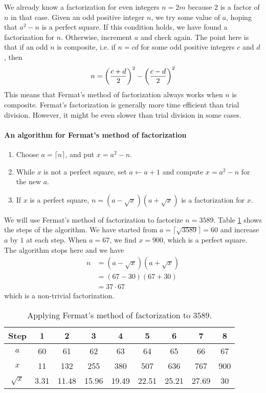 We already know a factorization for even integers $n=2m$ because $2$ is a factor of $n$ in that case. Given an odd positive integer $n$, we try some value of $a$, hoping that $a^2-n$ is a perfect square. If this condition holds, we have found a factorization for $n$. Otherwise, increment $a$ and check again. The point here is that if an odd $n$ is composite, i.e. if $n=cd$ for some odd positive integers $c$ and $d$, then
	\begin{align*}
		n = \left(\frac{c+d}{2}\right)^2 - \left(\frac{c-d}{2}\right)^2
	\end{align*}
This means that Fermat's method of factorization always works when $n$ is composite. Fermat's factorization is generally more time efficient than trial division. However, it might be even slower than trial division in some cases.
\paragraph{An algorithm for Fermat's method of factorization}
	\begin{enumerate}[1.]
		\item Choose $a=\lceil n \rceil$, and put $x=a^2-n$.
		\item While $x$ is not a perfect square, set $a \longleftarrow a+1$ and compute $x=a^2-n$ for the new $a$.
		\item If $x$ is a perfect square, $n=(a-\sqrt x)(a+\sqrt x)$ is a factorization for $x$.
	\end{enumerate}

\begin{example}
	We will use Fermat's method of factorization to factorize $n=3589$. Table \ref{table:fermat} shows the steps of the algorithm. We have started from $a=\lceil\sqrt{3589} \rceil=60$ and increase $a$ by $1$ at each step. When $a=67$, we find $x=900$, which is a perfect square. The algorithm stops here and we have
		\begin{align*}
			n &= (a-\sqrt x)(a+\sqrt x)\\
	  &= (67-30)(67+30)\\
	  &= 37 \cdot 67
		\end{align*}
	which is a non-trivial factorization.
		\begin{table}
			\centering
			\begin{tabular}{|c|c|c|c|c|c|c|c| c|}
				\hline
				Step & 1 & 2 & 3 & 4 & 5 & 6 & 7 & 8 \\
				\hline
				$a$ & 60 & 61 & 62 & 63 & 64 & 65 & 66 & 67 \\
				\hline
				$x$ & 11 & 132 & 255 & 380 & 507 & 636 & 767 & 900 \\
				\hline
				$\sqrt x$ & 3.31 & 11.48 & 15.96 & 19.49 & 22.51 & 25.21 & 27.69 & 30 \\
				\hline
			\end{tabular}
			\caption{Applying Fermat's method of factorization to $3589$.}
			\label{table:fermat}
		\end{table}
\end{example}
